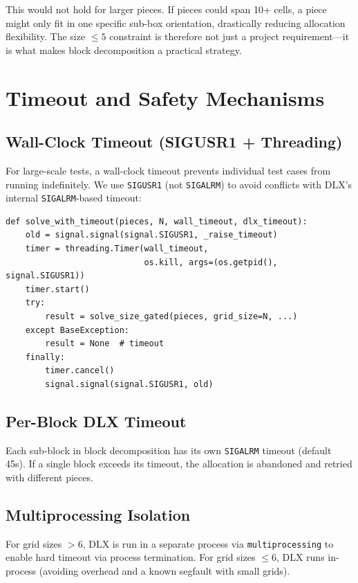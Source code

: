 \documentclass[11pt]{article}
\begin{document}
This would not hold for larger pieces. If pieces could span 10+ cells, a piece might only fit in one specific sub-box orientation, drastically reducing allocation flexibility. The size $\leq 5$ constraint is therefore not just a project requirement---it is what makes block decomposition a practical strategy.

\section{Timeout and Safety Mechanisms}

\subsection{Wall-Clock Timeout (SIGUSR1 + Threading)}

For large-scale tests, a wall-clock timeout prevents individual test cases from running indefinitely. We use \texttt{SIGUSR1} (not \texttt{SIGALRM}) to avoid conflicts with DLX's internal \texttt{SIGALRM}-based timeout:

\begin{lstlisting}
def solve_with_timeout(pieces, N, wall_timeout, dlx_timeout):
    old = signal.signal(signal.SIGUSR1, _raise_timeout)
    timer = threading.Timer(wall_timeout,
                            os.kill, args=(os.getpid(), signal.SIGUSR1))
    timer.start()
    try:
        result = solve_size_gated(pieces, grid_size=N, ...)
    except BaseException:
        result = None  # timeout
    finally:
        timer.cancel()
        signal.signal(signal.SIGUSR1, old)
\end{lstlisting}

\subsection{Per-Block DLX Timeout}

Each sub-block in block decomposition has its own \texttt{SIGALRM} timeout (default 45s). If a single block exceeds its timeout, the allocation is abandoned and retried with different pieces.

\subsection{Multiprocessing Isolation}

For grid sizes $> 6$, DLX is run in a separate process via \texttt{multiprocessing} to enable hard timeout via process termination. For grid sizes $\leq 6$, DLX runs in-process (avoiding overhead and a known segfault with small grids).
\end{document}
